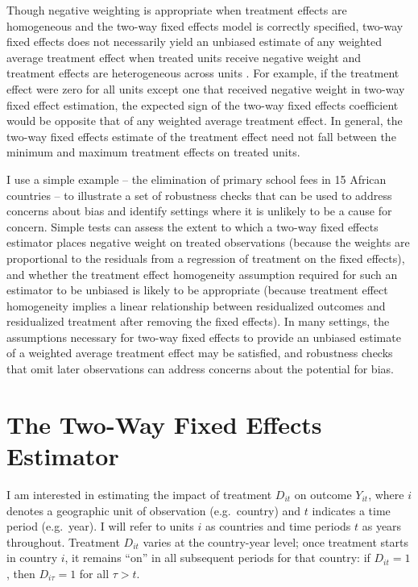 \documentclass[11pt]{article}
\begin{document}
Though negative weighting is appropriate when treatment effects are homogeneous and the two-way fixed effects model is correctly specified, two-way fixed effects does not necessarily yield an unbiased estimate of any weighted average treatment effect when treated units receive negative weight and treatment effects are heterogeneous across units \cite{Chaisemartin2020,GoodmanBacon2020,CallawaySantanna2020,SunAbraham2020,Baker2021}. For example, if the treatment effect were zero for all units except one that received negative weight in two-way fixed effect estimation, the expected sign of the two-way fixed effects coefficient would be opposite that of any weighted average treatment effect.  In general, the two-way fixed effects estimate of the treatment effect need not fall between the minimum and maximum treatment effects on treated units.

I use a simple example -- the elimination of primary school fees in 15 African countries -- to illustrate a set of robustness checks that can be used to address concerns about bias and identify settings where it is unlikely to be a cause for concern.  Simple tests can assess the extent to which a two-way fixed effects estimator places negative weight on treated observations (because the weights are proportional to the residuals from a regression of treatment on the fixed effects), and whether the treatment effect homogeneity assumption required for such an estimator to be unbiased is likely to be appropriate (because treatment effect homogeneity implies a linear relationship between residualized outcomes and residualized treatment after removing the fixed effects).  In many settings, the assumptions necessary for two-way fixed effects to provide an unbiased estimate of a weighted average treatment effect may be satisfied, and robustness checks that omit later observations can address concerns about the potential for bias.

\section{The Two-Way Fixed Effects Estimator}

I am interested in estimating the impact of treatment $D_{it}$ on 
outcome $Y_{it}$, where $i$ denotes a geographic unit of observation (e.g.~country) 
and $t$ indicates a time period (e.g.~year).  I will refer to 
units $i$ as countries and time periods $t$ as years throughout.  
Treatment $D_{it}$ varies at the country-year level; once treatment 
starts in country $i$, it remains 
``on'' in all subsequent periods for that country:  if $D_{it} = 1$, then 
$D_{i \tau} = 1$ for all $\tau > t$.  
\end{document}
